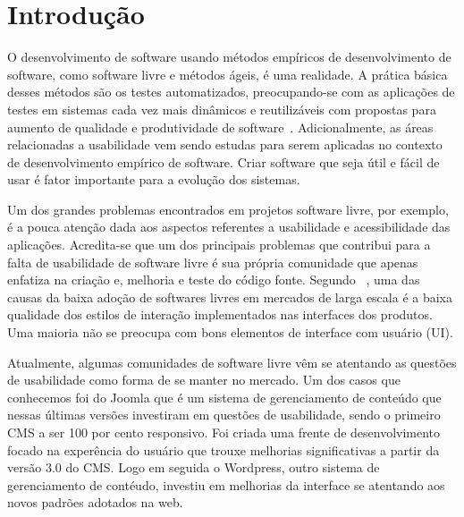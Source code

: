 \chapter{Introdução}

O desenvolvimento de software usando métodos empíricos de desenvolvimento de software, como software livre e métodos ágeis, é uma realidade.
%
A prática básica desses métodos são os testes automatizados, preocupando-se com as aplicações de testes em sistemas cada vez mais dinâmicos e reutilizáveis com propostas para aumento de qualidade e produtividade de software~\cite{vicente2010}.
%
Adicionalmente, as áreas relacionadas a usabilidade vem sendo estudas para serem aplicadas no contexto de desenvolvimento empírico de software. Criar software que seja útil e fácil de usar é fator importante para a evolução dos sistemas.

Um dos grandes problemas encontrados em projetos software livre, por exemplo, é a pouca atenção dada aos aspectos referentes a usabilidade e acessibilidade das aplicações. Acredita-se que um dos principais problemas que contribui para a falta de usabilidade de software livre é sua própria comunidade que apenas enfatiza na criação e, melhoria e teste do código fonte.
%
Segundo ~, uma das causas da baixa adoção de softwares livres em mercados de larga escala é a baixa qualidade dos estilos de interação implementados nas interfaces dos produtos. Uma maioria não se preocupa com bons elementos de interface com usuário (UI). 

Atualmente, algumas comunidades de software livre vêm se atentando as questões de usabilidade como forma de se manter no mercado. Um dos casos que conhecemos foi do Joomla que é um sistema de gerenciamento de conteúdo que nessas últimas versões investiram em questões de usabilidade, sendo o primeiro CMS a ser 100 por cento responsivo.
Foi criada uma frente de desenvolvimento focado na experência do usuário que trouxe melhorias significativas a partir da versão 3.0 do CMS.
Logo em seguida o Wordpress, outro sistema de gerenciamento de contéudo, investiu em melhorias da interface se atentando aos novos padrões adotados na web.


